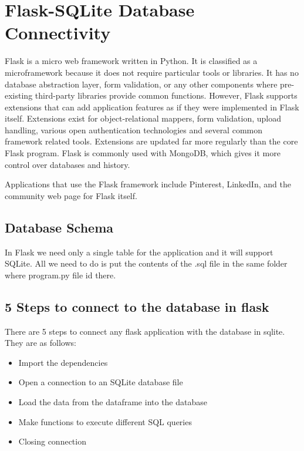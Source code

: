 \chapter{Flask-SQLite Database Connectivity}
Flask is a micro web framework written in Python. It is classified as a microframework because it does not require particular tools or libraries. It has no database abstraction layer, form validation, or any other components where pre-existing third-party libraries provide common functions. However, Flask supports extensions that can add application features as if they were implemented in Flask itself. Extensions exist for object-relational mappers, form validation, upload handling, various open authentication technologies and several common framework related tools. Extensions are updated far more regularly than the core Flask program. Flask is commonly used with MongoDB, which gives it more control over databases and history.

Applications that use the Flask framework include Pinterest, LinkedIn, and the community web page for Flask itself.\\
\section{Database Schema}
In Flask we need only a single table for the application and it will support SQLite. All we need to do is put the contents of the .sql file in the same folder where program.py file id there.
\\
\section{5 Steps to connect to the database in flask}
There are 5 steps to connect any flask application with the database in sqlite. They are as follows: 
\begin{itemize}
\item{Import the dependencies }
\item{Open a connection to an SQLite database file} 
\item{Load the data from the dataframe into the database} 
\item{Make functions to execute different SQL queries} 
\item{Closing connection}
\end{itemize}


